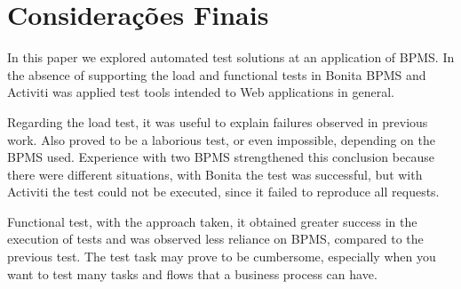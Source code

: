 \documentclass[runningheads,a4paper]{llncs}
\begin{document}

\section{Considerações Finais}\label{s:conclu}

In this paper we explored automated test solutions at an application of BPMS. In the absence of supporting the load and functional tests in Bonita BPMS and Activiti was applied test tools intended to Web applications in general.


Regarding the load test, it was useful to explain failures observed in previous work. Also proved to be a laborious test, or even impossible, depending on the BPMS used. Experience with two BPMS strengthened this conclusion because there were different situations, with Bonita the test was successful, but with Activiti the test could not be executed, since it failed to reproduce all requests. 


Functional test, with the approach taken, it obtained greater success in the execution of tests and was observed less reliance on BPMS, compared to the previous test. The test task may prove to be cumbersome, especially when you want to test many tasks and flows that a business process can have.

\end{document}
